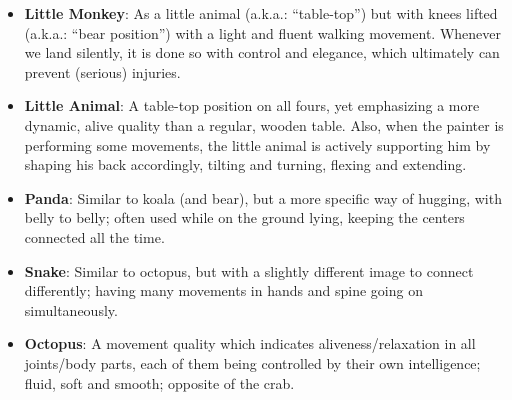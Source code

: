 \begin{itemize}
    \item \textbf{Little Monkey}: As a little animal (a.k.a.: ``table-top'') but with knees lifted (a.k.a.: ``bear position'') with a light and fluent walking movement.
    Whenever we land silently, it is done so with control and elegance, which ultimately can prevent (serious) injuries.
    \item \textbf{Little Animal}: A table-top position on all fours, yet emphasizing a more dynamic, alive quality than a regular, wooden table.
    Also, when the painter is performing some movements, the little animal is actively supporting him by shaping his back accordingly, tilting and turning, flexing and extending.
    \item \textbf{Panda}: Similar to koala (and bear), but a more specific way of hugging, with belly to belly; often used while on the ground lying, keeping the centers connected all the time.
    \item \textbf{Snake}: Similar to octopus, but with a slightly different image to connect differently; having many movements in hands and spine going on simultaneously.
    \item \textbf{Octopus}: A movement quality which indicates aliveness/relaxation in all joints/body parts, each of them being controlled by their own intelligence; fluid, soft and smooth; opposite of the crab.
\end{itemize}
